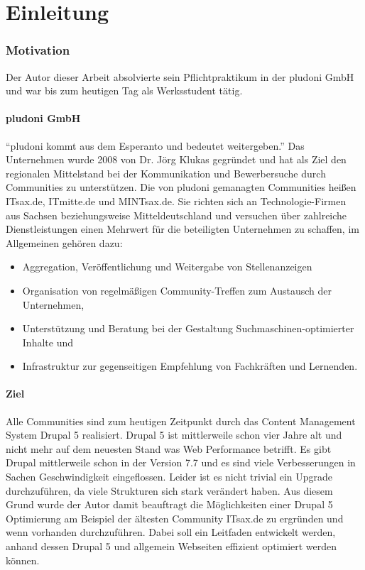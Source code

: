 \part{Einleitung}

\label{sec:intro}
\section{Motivation}

Der Autor dieser Arbeit absolvierte sein Pflichtpraktikum in der pludoni GmbH und war bis zum heutigen Tag als Werksstudent tätig.
\subsection{pludoni GmbH}
“pludoni kommt aus dem Esperanto und bedeutet weitergeben.” Das Unternehmen wurde 2008 von Dr. Jörg Klukas gegründet und hat als Ziel den regionalen Mittelstand bei der Kommunikation und Bewerbersuche durch Communities zu unterstützen. Die von pludoni gemanagten Communities heißen ITsax.de, ITmitte.de und MINTsax.de. Sie richten sich an Technologie-Firmen aus Sachsen beziehungsweise Mitteldeutschland und versuchen über zahlreiche Dienstleistungen einen Mehrwert für die beteiligten Unternehmen zu schaffen, im Allgemeinen gehören dazu:

\begin{itemize}
 \item Aggregation, Veröffentlichung und Weitergabe von Stellenanzeigen
 \item Organisation von regelmäßigen Community-Treffen zum Austausch der Unternehmen,
 \item Unterstützung und Beratung bei der Gestaltung Suchmaschinen-optimierter Inhalte und
 \item Infrastruktur zur gegenseitigen Empfehlung von Fachkräften und Lernenden.
\end{itemize}

\subsection{Ziel}
Alle Communities sind zum heutigen Zeitpunkt durch das Content Management System Drupal 5 realisiert. Drupal 5 ist mittlerweile schon vier Jahre alt und nicht mehr auf dem neuesten Stand was Web Performance betrifft. Es gibt Drupal mittlerweile schon in der Version 7.7 und es sind viele Verbesserungen in Sachen Geschwindigkeit eingeflossen. Leider ist es nicht trivial ein Upgrade durchzuführen, da viele Strukturen sich stark verändert haben. Aus diesem Grund wurde der Autor damit beauftragt die Möglichkeiten einer Drupal 5 Optimierung am Beispiel der ältesten Community ITsax.de zu ergründen und wenn vorhanden durchzuführen. Dabei soll ein Leitfaden entwickelt werden, anhand dessen Drupal 5 und allgemein Webseiten effizient optimiert werden können.

